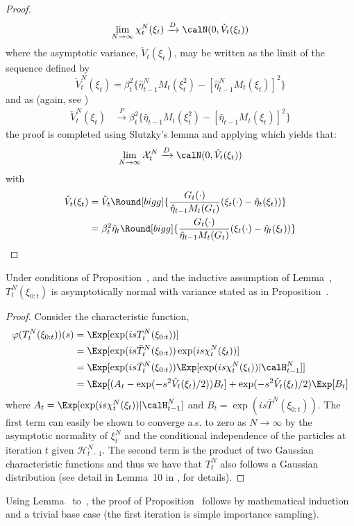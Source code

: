 \begin{proof}
\begin{equation}
    \lim_{N \to\infty}\chi_t^N(\xi_t)%
    \xrightarrow{D}\calN(0,\check{V}_t(\xi_t))
  \end{equation}
  where the asymptotic variance, $\check{V}_t(\xi_t)$, may be written as the limit
  of the sequence defined by
  \begin{equation}
    \check{V}_t^N(\xi_t) = \beta_t^2 \{\hat\eta_{t-1}^N M_t (\xi_t^2) -
    [\hat\eta_{t-1}^NM_t(\xi_t)]^2\}
  \end{equation}
  and as (again, see \cite[][sec.~7.4]{DelMoral:2004ux})
  \begin{align*}
    \check{V}_t^N(\xi_t)
    &\xrightarrow{P} \beta_t^2 \{\hat\eta_{t-1}M_t(\xi_t^2) -
    [\hat\eta_{t-1}M_t(\xi_t)]^2\}
  \end{align*}
  the proof is completed using Slutzky's lemma and applying
  \cite[][Lemma~\textsc{a2}]{Chopin:2004cn} which yields that:
  \begin{align*}
    \lim_{N \rightarrow \infty} \mathcal{X}_t^N \xrightarrow{D}
  \calN(0,\hat{V}_t(\xi_t))
\end{align*}
with
\begin{align*}
  \hat{V}_t(\xi_t) &=
  \check{V}_t\Round[bigg]{\frac{G_t(\cdot)}{\hat\eta_{t-1}M_t(G_t)} (\xi_t(\cdot) -
    \hat\eta_t(\xi_t))} \\
  &= \beta_t^2 \hat\eta_t\Round[bigg]{
    \frac{G_t(\cdot)}{\hat\eta_{t-1}M_t(G_t)} (\xi_t(\cdot) -
    \hat\eta_t(\xi_t))}
\end{align*}
\end{proof}

\begin{lemma}\label{lem:normality}
  Under conditions of Proposition~, and the inductive
  assumption of Lemma~, $T_t^N(\xi_{0:t})$ is
  asymptotically normal with variance stated as in
  Proposition~.
\end{lemma}

\begin{proof}
  Consider the characteristic function,
  \begin{align*}
    \varphi(T_t^N(\xi_{0:t}))(s)
    &= \Exp[\exp(isT_t^N(\xi_{0:t}))] \\
    &= \Exp[\exp(is\bar{T}_t^N(\xi_{0:t}))\exp(is\chi_t^N(\xi_t))] \\
    &= \Exp[\exp(is\bar{T}_t^N(\xi_{0:t}))
    \Exp[\exp(is\chi_t^N(\xi_t))|\calH_{t-1}^N]] \\
    &= \Exp[(A_t - \exp(-s^2\hat{V}_t(\xi_t)/2))B_t]
    +\exp(-s^2\hat{V}_t(\xi_t)/2)\Exp[B_t]
  \end{align*}
  where $A_t = \Exp[\exp(is\chi_t^N(\xi_t))|\calH_{t-1}^N]$ and $B_t =
  \exp(is\bar{T}^N(\xi_{0:t}))$. The first term can easily be shown to
  converge a.s. to zero as $N\to\infty$ by the asymptotic normality of
  $\xi_t^N$ and the conditional independence of the particles at iteration $t$
  given $\mathcal{H}_{t-1}^N$. The second term is the product of two Gaussian
  characteristic functions and thus we have that $T_t^N$ also follows a
  Gaussian distribution (see detail in Lemma~10{} in \cite{Johansen:2006iv},
  for details).
\end{proof}

Using Lemma~ to~, the proof of
Proposition~ follows by mathematical induction and a trivial
base case (the first iteration is simple importance sampling).

